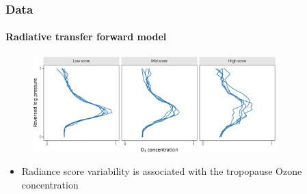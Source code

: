 \documentclass{snedecorbeamer}
\begin{document}
\begin{frame}[c]
  \frametitle{Data}
  \framesubtitle{Radiative transfer forward model}

  \begin{figure}
    \centering
    \includegraphics[height=10em]{inc/mls_input_profiles}
  \end{figure}

  \begin{itemize}
  \item Radiance score variability is associated with the tropopause Ozone
    concentration
  \end{itemize}
\end{frame}
\end{document}

